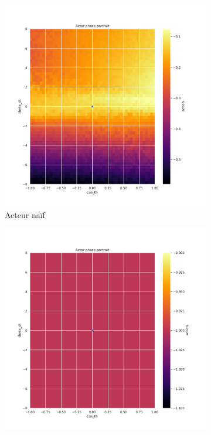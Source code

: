 \begin{figure}[H]
    \centering
    \begin{subfigure}{0.3\textwidth}
        \includegraphics[width=\textwidth]{figures/prelimaire/0_actor_normalize__ante_Pendulum-v0.pdf}
        \caption{Acteur naïf}
    \end{subfigure}
    \begin{subfigure}{0.3\textwidth}
        \includegraphics[width=\textwidth]{figures/prelimaire/0_actor_normalize__post_Pendulum-v0.pdf}

\end{subfigure}
\end{figure}
